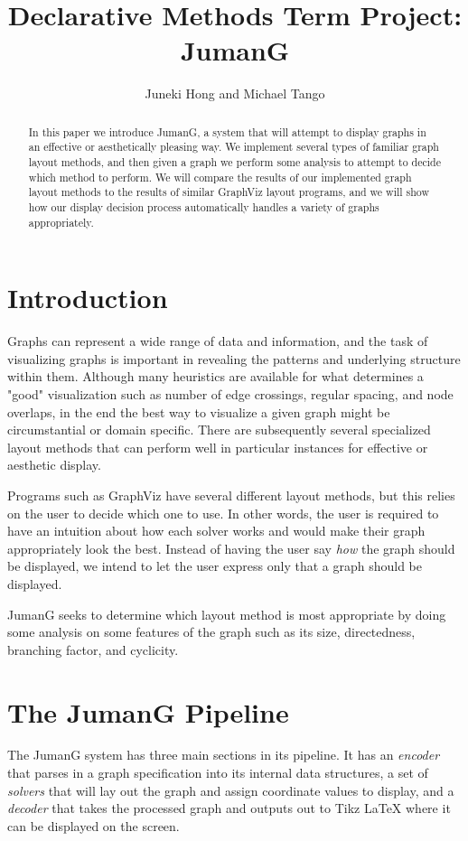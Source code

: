 \documentclass{article}
\title{Declarative Methods Term Project: \\ JumanG}
\author{Juneki Hong and Michael Tango}
\date{}
\begin{document}
\maketitle

\begin{abstract}
In this paper we introduce JumanG, a system that will attempt to display graphs in an effective or aesthetically pleasing way. We implement several types of familiar graph layout methods, and then given a graph we perform some analysis to attempt to decide which method to perform. We will compare the results of our implemented graph layout methods to the results of similar GraphViz layout programs, and we will show how our display decision process automatically handles a variety of graphs appropriately.
\end{abstract}

\section{Introduction}
Graphs can represent a wide range of data and information, and the task of visualizing graphs is important in revealing the patterns and underlying structure within them. Although many heuristics are available for what determines a "good" visualization such as number of edge crossings, regular spacing, and node overlaps, in the end the best way to visualize a given graph might be circumstantial or domain specific. 
There are subsequently several specialized layout methods that can perform well in particular instances for effective or aesthetic display.
 
Programs such as GraphViz have several different layout methods, but this relies on the user to decide which one to use. 
In other words, the user is required to have an intuition about how each solver works and would make their graph appropriately look the best. Instead of having the user say \textit{how} the graph should be displayed, we intend to let the user express only that a graph should be displayed.

JumanG seeks to determine which layout method is most appropriate by doing some analysis on some features of the graph such as its size, directedness, branching factor, and cyclicity.

\section{The JumanG Pipeline}
The JumanG system has three main sections in its pipeline. It has an \textit{encoder} that parses in a graph specification into its internal data structures, a set of \textit{solvers} that will lay out the graph and assign coordinate values to display, and a \textit{decoder} that takes the processed graph and outputs out to Tikz LaTeX where it can be displayed on the screen.
\end{document}
